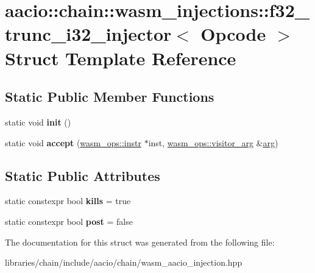 \hypertarget{structaacio_1_1chain_1_1wasm__injections_1_1f32__trunc__i32__injector}{}\section{aacio\+:\+:chain\+:\+:wasm\+\_\+injections\+:\+:f32\+\_\+trunc\+\_\+i32\+\_\+injector$<$ Opcode $>$ Struct Template Reference}
\label{structaacio_1_1chain_1_1wasm__injections_1_1f32__trunc__i32__injector}
\subsection*{Static Public Member Functions}
\begin{DoxyCompactItemize}
\item 
\mbox{\label{structaacio_1_1chain_1_1wasm__injections_1_1f32__trunc__i32__injector_ab120b55a769c4fe3779340614e7c1672}} 
static void {\bfseries init} ()
\item 
\mbox{\label{structaacio_1_1chain_1_1wasm__injections_1_1f32__trunc__i32__injector_a5c481e4940985f428355d5ed4ac6f5be}} 
static void {\bfseries accept} (\mbox{\hyperlink{structaacio_1_1chain_1_1wasm__ops_1_1instr}{wasm\+\_\+ops\+::instr}} $\ast$inst, \mbox{\hyperlink{structaacio_1_1chain_1_1wasm__ops_1_1visitor__arg}{wasm\+\_\+ops\+::visitor\+\_\+arg}} \&\mbox{\hyperlink{unionarg}{arg}})
\end{DoxyCompactItemize}
\subsection*{Static Public Attributes}
\begin{DoxyCompactItemize}
\item 
\mbox{\label{structaacio_1_1chain_1_1wasm__injections_1_1f32__trunc__i32__injector_a3d282e174db2daf123bc0a5f9447e087}} 
static constexpr bool {\bfseries kills} = true
\item 
\mbox{\label{structaacio_1_1chain_1_1wasm__injections_1_1f32__trunc__i32__injector_a907088805f7d9408c93ca3592b20e1b9}} 
static constexpr bool {\bfseries post} = false
\end{DoxyCompactItemize}


The documentation for this struct was generated from the following file\+:\begin{DoxyCompactItemize}
\item 
libraries/chain/include/aacio/chain/wasm\+\_\+aacio\+\_\+injection.\+hpp\end{DoxyCompactItemize}
